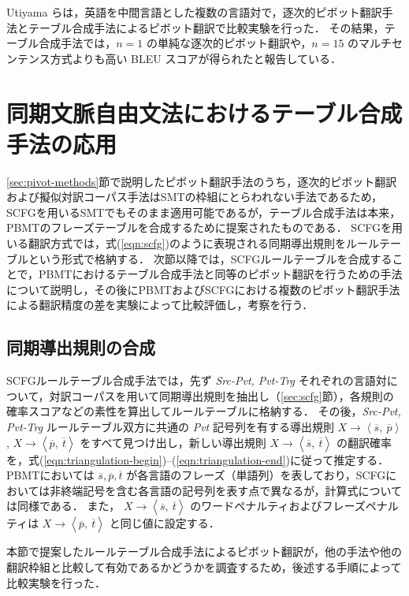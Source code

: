 \documentclass[japanese]{jnlp_1.4}
\begin{document}
Utiyama らは，英語を中間言語とした複数の言語対で，逐次的ピボット翻訳手法とテーブル合成手法によるピボット翻訳で比較実験を行った\cite{utiyama07}．
その結果，テーブル合成手法では，$n = 1$ の単純な逐次的ピボット翻訳や，$n = 15$ のマルチセンテンス方式よりも高い BLEU スコアが得られたと報告している．


\section{同期文脈自由文法におけるテーブル合成手法の応用}
\label{sec:pivot-scfg}

\ref{sec:pivot-methods}節で説明したピボット翻訳手法のうち，逐次的ピボット翻訳および擬似対訳コーパス手法はSMTの枠組にとらわれない手法であるため，SCFGを用いるSMTでもそのまま適用可能であるが，テーブル合成手法は本来，PBMTのフレーズテーブルを合成するために提案されたものである．
SCFGを用いる翻訳方式では，式(\ref{eqn:scfg})のように表現される同期導出規則をルールテーブルという形式で格納する．
次節以降では，SCFGルールテーブルを合成することで，PBMTにおけるテーブル合成手法と同等のピボット翻訳を行うための手法について説明し，その後にPBMTおよびSCFGにおける複数のピボット翻訳手法による翻訳精度の差を実験によって比較評価し，考察を行う．


\subsection{同期導出規則の合成}
\label{sec:rule-triangulation}

SCFGルールテーブル合成手法では，先ず \textit{Src-Pvt, Pvt-Trg} それぞれの言語対について，対訳コーパスを用いて同期導出規則を抽出し（\ref{sec:scfg}節），各規則の確率スコアなどの素性を算出してルールテーブルに格納する．
その後，\textit{Src-Pvt, Pvt-Trg} ルールテーブル双方に共通の \textit{Pvt} 記号列を有する導出規則 $X \rightarrow \left<\overline{s},~ \overline{p}\right>$, $X \rightarrow \left<\overline{p},~ \overline{t}\right>$ をすべて見つけ出し，新しい導出規則 $X \rightarrow \left<\overline{s},~ \overline{t}\right>$ の翻訳確率を，式(\ref{eqn:triangulation-begin})--(\ref{eqn:triangulation-end})に従って推定する．
PBMTにおいては $\overline{s}, \overline{p}, \overline{t}$ が各言語のフレーズ（単語列）を表しており，SCFGにおいては非終端記号を含む各言語の記号列を表す点で異なるが，計算式については同様である．
また， $X \rightarrow \left<\overline{s},~ \overline{t}\right>$ のワードペナルティおよびフレーズペナルティは $X \rightarrow \left<\overline{p},~ \overline{t}\right>$ と同じ値に設定する．

本節で提案したルールテーブル合成手法によるピボット翻訳が，他の手法や他の翻訳枠組と比較して有効であるかどうかを調査するため，後述する手順によって比較実験を行った．
\end{document}

